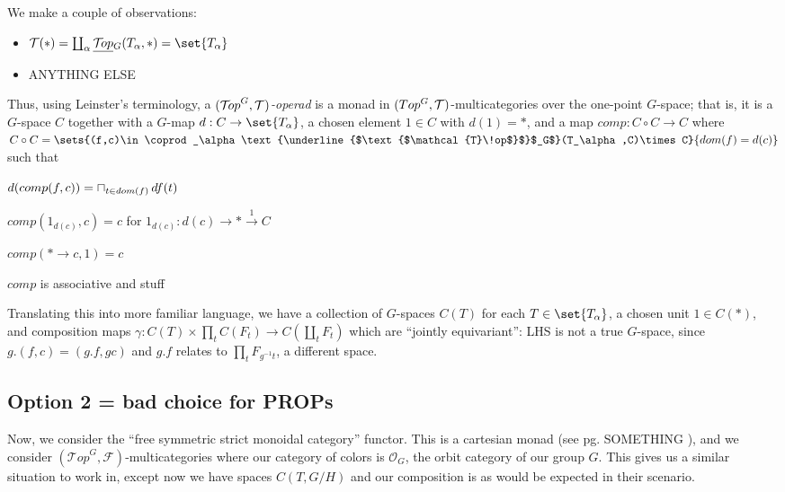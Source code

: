\documentclass{report}
\newenvironment{renumerate}
{\begin{list}{\roman{enumi}.}
    {\itemsep=0in\usecounter{enumi}}
  }{\end{list}}
\newcommand{\Top}{\text{$\mathcal{T}\!op$}}
\newcommand{\TopG}{\text{\underline{$\Top$}$_G$}}
\newcommand{\icap}{\operatornamewithlimits{\sqcap}}
\renewcommand{\O}{\text{$\mathcal{O}$}}
\begin{document}
We make a couple of observations:
\begin{itemize}\itemsep-4pt
\item $\T(*) = \coprod_\alpha\TopG(T_\alpha,*) = \set{T_\alpha}$
\item ANYTHING ELSE 
\end{itemize}

Thus, using Leinster's terminology, a {\em $(\Top^G, \T)$-operad} is a monad in $(Top^G,\text{$\mathcal{T}$})$-multicategories over the one-point $G$-space; that is, it is a $G$-space $C$ together with a $G$-map $d: C\to \set{T_\alpha}$, a chosen element $1\in C$ with $d(1) = *$, and a map $comp: C\circ C\to C$ where $C\circ C = \sets{(f,c)\in \coprod_\alpha\TopG(T_\alpha,C)\times C}{dom(f) = d(c)}$ such that
\begin{renumerate}
\item $d(comp(f,c)) = \icap_{t\in dom(f)}df(t)$
\item $comp(1_{d(c)},c) = c$ for $1_{d(c)}: d(c) \to * \overset{1}{\to} C$
\item $comp(*\to c, 1) = c$
\item $comp$ is associative and stuff 
\end{renumerate}

Translating this into more familiar language, we have a collection of $G$-spaces $C(T)$ for each $T\in \set{T_\alpha}$, a chosen unit $1\in C(*)$, and composition maps $\gamma:C(T)\times \prod_tC(F_t)\to C(\coprod_tF_t)$ which are ``jointly equivariant'': LHS is not a true $G$-space, since $g.(f,c) = (g.f,gc)$ and $g.f$ relates to $\prod_tF_{g^{-1}t}$, a different space. 


\subsection{Option 2 = bad choice for PROPs}
Now, we consider the ``free symmetric strict monoidal category'' functor. This is a cartesian monad (see \cite{leinster_higher_2003} pg. SOMETHING ), and we consider $(\Top^G,\mathcal{F})$-multicategories where our category of colors is $\O_G$, the orbit category of our group $G$. This gives us a similar situation to work in, except now we have spaces $C(T,G/H)$ and our composition is as would be expected in their scenario. 
\end{document}
